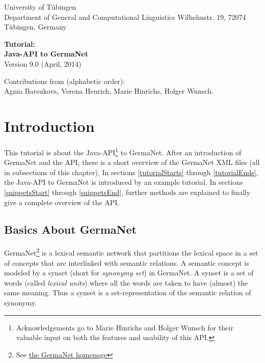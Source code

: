 \documentclass[12pt,a4paper,english,utf8]{report}
\begin{document}
\begin{titlepage}
\begin{flushleft}
{\large University of Tübingen\\
Department of General and Computational Linguistics
Wilhelmstr. 19, 72074 Tübingen, Germany}\\[4.5cm]
\end{flushleft}

\begin{center}
{\huge \bfseries Tutorial:\\[0.4cm]
Java-API to GermaNet}\\[1.0cm]
{\large Version 9.0 (April, 2014)}\\[10.0cm]
\end{center}

\begin{flushleft} \small
Contributions from (alphabetic order):\\
Agnia Barsukova, Verena Henrich, Marie Hinrichs, Holger Wunsch.
\end{flushleft}


\end{titlepage}

\tableofcontents
\newpage



\chapter{Introduction}
This tutorial is about the Java-API\footnote{Acknowledgements go to Marie Hinrichs and Holger Wunsch for their valuable input on both the features and usability of this API.} to GermaNet. After an introduction of GermaNet and the API, there is a short overview of the GermaNet XML files (all in subsections of this chapter). In sections \ref{tutorialStarts} through \ref{tutorialEnds}, the Java-API to GermaNet is introduced by an example tutorial. In sections \ref{snippetsStart} through \ref{snippetsEnd}, further methods are explained to finally give a complete overview of the API.



\section{Basics About GermaNet}
GermaNet\footnote{See \href{http://www.sfs.uni-tuebingen.de/GermaNet/}{the GermaNet homepage}} is a lexical semantic network that partitions the lexical space in a set of concepts that are interlinked with semantic relations. A semantic concept is modeled by a synset (short for \emph{synonymy set}) in GermaNet. A synset is a set of words (called \emph{lexical units}) where all the words are taken to have (almost) the same meaning. Thus a synset is a set-representation of the semantic relation of synonymy.
\end{document}
